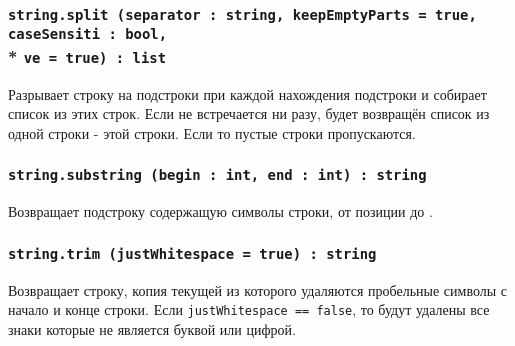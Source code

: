\subsubsection{\lstinline|string.split (separator : string, keepEmptyParts = true, caseSensiti : bool,|\\* \lstinline|ve = true) : list|}

Разрывает строку на подстроки при каждой нахождения подстроки  и собирает список из этих строк. Если  не встречается ни разу, будет возвращён список из одной строки - этой строки. Если  то пустые строки пропускаются.

\subsubsection{\lstinline|string.substring (begin : int, end : int) : string|}

Возвращает подстроку содержащую символы строки, от позиции  до .

\subsubsection{\lstinline|string.trim (justWhitespace = true) : string|}

Возвращает строку, копия текущей из которого удаляются пробельные символы с начало и конце строки. Если \lstinline|justWhitespace == false|, то будут удалены все знаки которые не является буквой или цифрой.


